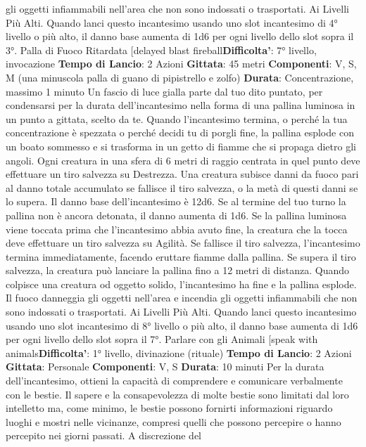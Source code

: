 \begin{multicols}{2}
gli oggetti infiammabili nell’area che non sono indossati
o trasportati.
Ai Livelli Più Alti. Quando lanci questo incantesimo
usando uno slot incantesimo di 4° livello o più alto, il
danno base aumenta di 1d6 per ogni livello dello slot
sopra il 3°.
Palla di Fuoco Ritardata
[delayed blast fireball\textbf{Difficolta'}:
7° livello, invocazione
\textbf{Tempo di Lancio}: 2 Azioni
\textbf{Gittata}: 45 metri
\textbf{Componenti}: V, S, M (una minuscola palla di guano di
pipistrello e zolfo)
\textbf{Durata}: Concentrazione, massimo 1 minuto
Un fascio di luce gialla parte dal tuo dito puntato, per
condensarsi per la durata dell’incantesimo nella forma
di una pallina luminosa in un punto a gittata, scelto da
te. Quando l’incantesimo termina, o perché la tua
concentrazione è spezzata o perché decidi tu di porgli
fine, la pallina esplode con un boato sommesso e si
trasforma in un getto di fiamme che si propaga dietro gli
angoli. Ogni creatura in una sfera di 6 metri di raggio
centrata in quel punto deve effettuare un tiro salvezza
su Destrezza. Una creatura subisce danni da fuoco pari
al danno totale accumulato se fallisce il tiro salvezza, o
la metà di questi danni se lo supera.
Il danno base dell’incantesimo è 12d6. Se al termine del
tuo turno la pallina non è ancora detonata, il danno
aumenta di 1d6.
Se la pallina luminosa viene toccata prima che
l’incantesimo abbia avuto fine, la creatura che la tocca
deve effettuare un tiro salvezza su Agilità. Se
fallisce il tiro salvezza, l’incantesimo termina
immediatamente, facendo eruttare fiamme dalla pallina.
Se supera il tiro salvezza, la creatura può lanciare la
pallina fino a 12 metri di distanza. Quando colpisce una
creatura od oggetto solido, l’incantesimo ha fine e la
pallina esplode.
Il fuoco danneggia gli oggetti nell’area e incendia gli
oggetti infiammabili che non sono indossati o
trasportati.
Ai Livelli Più Alti. Quando lanci questo incantesimo
usando uno slot incantesimo di 8° livello o più alto, il
danno base aumenta di 1d6 per ogni livello dello slot
sopra il 7°.
Parlare con gli Animali
[speak with animals\textbf{Difficolta'}:
1° livello, divinazione (rituale)
\textbf{Tempo di Lancio}: 2 Azioni
\textbf{Gittata}: Personale
\textbf{Componenti}: V, S
\textbf{Durata}: 10 minuti
Per la durata dell’incantesimo, ottieni la capacità di
comprendere e comunicare verbalmente con le bestie.
Il sapere e la consapevolezza di molte bestie sono
limitati dal loro intelletto ma, come minimo, le bestie
possono fornirti informazioni riguardo luoghi e mostri
nelle vicinanze, compresi quelli che possono percepire
o hanno percepito nei giorni passati. A discrezione del

\end{multicols}
